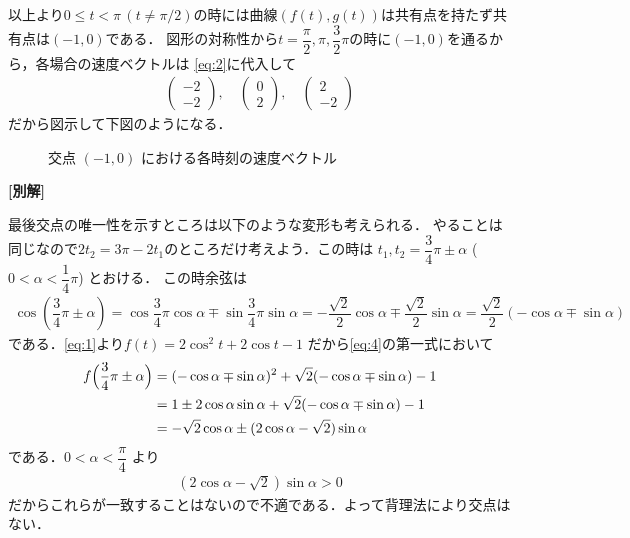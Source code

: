 \documentclass[../../main.tex]{subfiles}
\begin{document}
以上より$0\le t < \pi\, (t \neq \pi/2)$の時には曲線$(f(t),g(t))$は共有点を持たず共有点は$(-1,0)$である．
図形の対称性から$t = \dfrac{\pi}{2}, \pi, \dfrac{3}{2}\pi$の時に$(-1,0)$を通るから，各場合の速度ベクトルは
\cref{eq:2}に代入して
\begin{align}
  \begin{pmatrix} -2 \\ -2
  \end{pmatrix}, \quad
  \begin{pmatrix} 0 \\ 2
  \end{pmatrix}, \quad
  \begin{pmatrix} 2 \\ -2
  \end{pmatrix}
\end{align}
だから図示して下図のようになる．

\begin{figure}[htb]
  \centering
  \caption{交点 $(-1,0)$ における各時刻の速度ベクトル}
\end{figure}

{\bf [別解]}

最後交点の唯一性を示すところは以下のような変形も考えられる．
やることは同じなので$2t_2 = 3\pi - 2t_1$のところだけ考えよう．この時は
$t_1, t_2 = \dfrac{3}{4}\pi \pm \alpha$ ($0 < \alpha < \dfrac{1}{4}\pi$) とおける．
この時余弦は
\begin{align}
  \cos\left(\dfrac{3}{4}\pi \pm \alpha\right)
  = \cos\dfrac{3}{4}\pi\cos\alpha \mp \sin\dfrac{3}{4}\pi\sin\alpha
  = -\dfrac{\sqrt{2}}{2}\cos\alpha \mp \dfrac{\sqrt{2}}{2}\sin\alpha
  = \dfrac{\sqrt{2}}{2}(-\cos\alpha \mp \sin\alpha)
\end{align}
である．\cref{eq:1}より$f(t) = 2\cos^2t + 2\cos t - 1$ だから\cref{eq:4}の第一式において
\begin{align}
  f\Bigl(\dfrac{3}{4}\pi \pm \alpha\Bigr)
  & = (-\cos\alpha \mp \sin\alpha)^2 + \sqrt{2}(-\cos\alpha \mp \sin\alpha) - 1 \\
  & = 1 \pm 2\cos\alpha\sin\alpha + \sqrt{2}(-\cos\alpha \mp \sin\alpha) - 1 \\
  & = -\sqrt{2}\cos\alpha \pm (2\cos\alpha-\sqrt{2})\sin\alpha
\end{align}
である．$0 < \alpha < \dfrac{\pi}{4}$ より
\begin{align}
  (2\cos\alpha-\sqrt{2})\sin\alpha > 0
\end{align}
だからこれらが一致することはないので不適である．よって背理法により交点はない．
\end{document}

